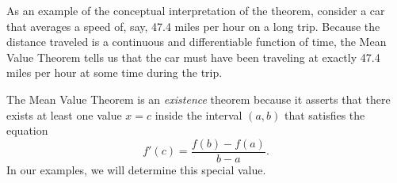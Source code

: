 \documentclass[handout]{ximera}
\begin{document}
\begin{image}
\end{image}

As an example of the conceptual interpretation of the theorem, consider a car that averages a speed of, say, 47.4 miles per hour on a long trip. 
Because the distance traveled is a continuous and differentiable function of time, the Mean Value Theorem tells us that the car must have been 
traveling at exactly 47.4 miles per hour at some time during the trip.

The Mean Value Theorem is an {\it existence} theorem because it asserts that there exists at least one value $x=c$ inside the interval $(a,b)$
that satisfies the equation 
\[f'(c) = \frac{f(b) - f(a)}{b-a}.\]
In our examples, we will determine this special value. 
\end{document}
